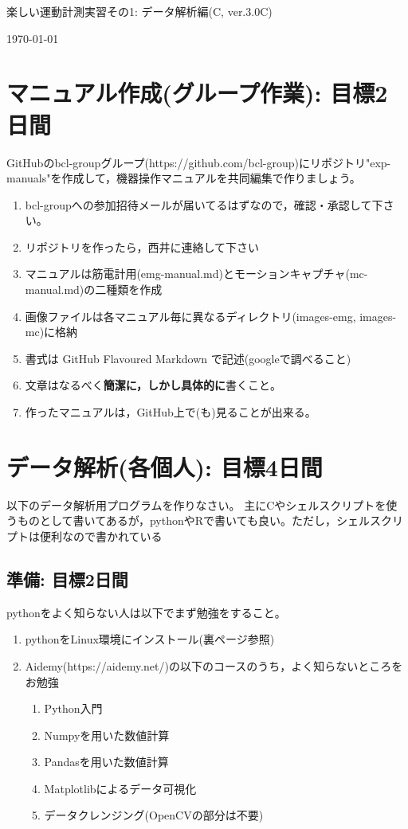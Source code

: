 \documentclass{jsarticle}
\def\version{3.0C}
\begin{document}
\begin{center}
  {\LARGE 楽しい運動計測実習その1: データ解析編(C, ver.\version)}
\end{center}
\begin{flushright}
\today
\end{flushright}


\section{マニュアル作成(グループ作業): 目標2日間}
GitHubのbcl-groupグループ(https://github.com/bcl-group)にリポジトリ"exp-manuals"を作成して，機器操作マニュアルを共同編集で作りましょう。
\begin{enumerate}
  \item bcl-groupへの参加招待メールが届いてるはずなので，確認・承認して下さい。
  \item リポジトリを作ったら，西井に連絡して下さい
  \item マニュアルは筋電計用(emg-manual.md)とモーションキャプチャ(mc-manual.md)の二種類を作成
  \item 画像ファイルは各マニュアル毎に異なるディレクトリ(images-emg, images-mc)に格納
  \item 書式は GitHub Flavoured Markdown で記述(googleで調べること)
  \item 文章はなるべく\textbf{簡潔に，しかし具体的に}書くこと。
  \item 作ったマニュアルは，GitHub上で(も)見ることが出来る。
\end{enumerate}


\section{データ解析(各個人): 目標4日間}
以下のデータ解析用プログラムを作りなさい。
主にCやシェルスクリプトを使うものとして書いてあるが，pythonやRで書いても良い。ただし，シェルスクリプトは便利なので書かれている

\subsection{準備: 目標2日間}
pythonをよく知らない人は以下でまず勉強をすること。
\begin{enumerate}
 \item pythonをLinux環境にインストール(裏ページ参照)
        \item Aidemy(https://aidemy.net/)の以下のコースのうち，よく知らないところをお勉強
        \begin{enumerate}
                \item Python入門
                \item Numpyを用いた数値計算
                \item Pandasを用いた数値計算
                \item Matplotlibによるデータ可視化
                \item データクレンジング(OpenCVの部分は不要)
        \end{enumerate}
\end{enumerate}
\end{document}
